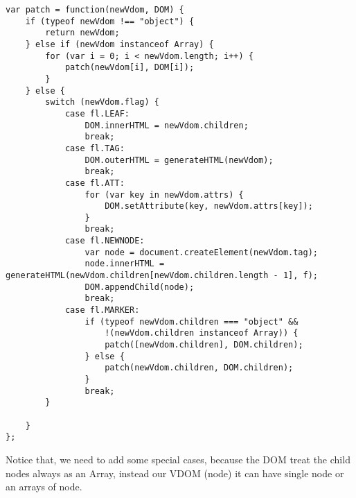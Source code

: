 \documentclass[10pt]{article}
\begin{document}
\begin{lstlisting}[caption=\textit{patch} function]
var patch = function(newVdom, DOM) {
    if (typeof newVdom !== "object") {
        return newVdom;
    } else if (newVdom instanceof Array) {
        for (var i = 0; i < newVdom.length; i++) {
            patch(newVdom[i], DOM[i]);
        }
    } else {
        switch (newVdom.flag) {
            case fl.LEAF:
                DOM.innerHTML = newVdom.children;
                break;
            case fl.TAG:
                DOM.outerHTML = generateHTML(newVdom);
                break;
            case fl.ATT:
                for (var key in newVdom.attrs) {
                    DOM.setAttribute(key, newVdom.attrs[key]);
                }
                break;
            case fl.NEWNODE:
                var node = document.createElement(newVdom.tag);
                node.innerHTML = generateHTML(newVdom.children[newVdom.children.length - 1], f);
                DOM.appendChild(node);
                break;
            case fl.MARKER:
                if (typeof newVdom.children === "object" &&
                    !(newVdom.children instanceof Array)) {
                    patch([newVdom.children], DOM.children);
                } else {
                    patch(newVdom.children, DOM.children);
                }
                break;
        }

    }
};
\end{lstlisting} 
Notice that, we need to add some special cases, because the DOM treat the child nodes always as an Array, instead our VDOM (node) it can have single node or an arrays of node.
\end{document}
